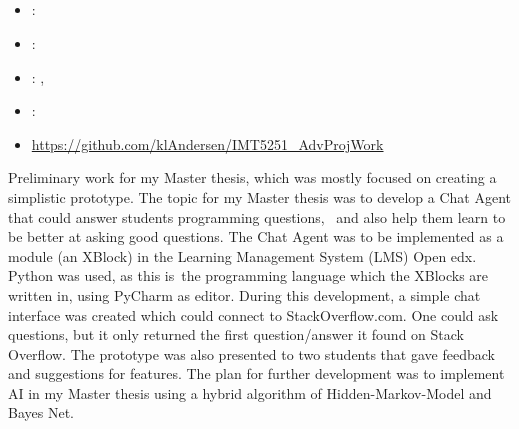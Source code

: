 \subsection[Advanced Project Work]{}
\label{sec:adv_proj_work}
\begin{itemize} 
	\item {}: 
	\item {}: 
	\item {}: , 
	\item {}: 
	\item {} \url{https://github.com/klAndersen/IMT5251_AdvProjWork}
\end{itemize} 
Preliminary work for my Master thesis, which was mostly focused on creating a simplistic prototype. 
The topic for my Master thesis was to develop a Chat Agent that could answer students programming questions,  and also help them learn to be better at asking good questions. 
The Chat Agent was to be implemented as a module (an XBlock) in the Learning Management System (LMS) Open edx. 
Python was used, as this is the programming language which the XBlocks are written in, using  PyCharm as editor. 
\vspace{0.5em}\newline
During this development, a simple chat interface was created which could connect to StackOverflow.com. 
One could ask questions, but it only returned the first question/answer it found on Stack Overflow. 
The prototype was also presented to two students that gave feedback and suggestions for features. 
The plan for further development was to implement AI in my Master thesis using a hybrid algorithm of Hidden-Markov-Model and Bayes Net. 

